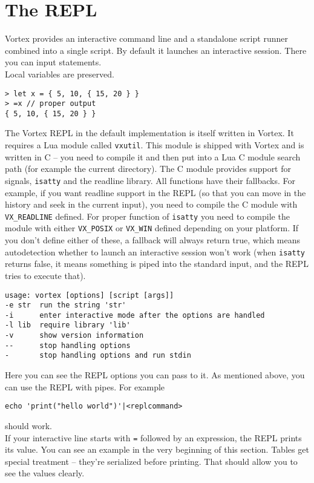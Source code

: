 \documentclass{article}
\begin{document}
\section{The REPL}
Vortex provides an interactive command line and a standalone script runner
combined into a single script. By default it launches an interactive session.
There you can input statements.\\
Local variables are preserved.
\begin{lstlisting}[language=vortex,numbers=none]
> let x = { 5, 10, { 15, 20 } }
> =x // proper output
{ 5, 10, { 15, 20 } }
\end{lstlisting}
The Vortex REPL in the default implementation is itself written in Vortex.
It requires a Lua module called \verb|vxutil|. This module is shipped with
Vortex and is written in C -- you need to compile it and then put into a
Lua C module search path (for example the current directory). The C module
provides support for signals, \verb|isatty| and the readline library. All
functions have their fallbacks. For example, if you want readline support in
the REPL (so that you can move in the history and seek in the current input),
you need to compile the C module with \verb|VX_READLINE| defined. For proper
function of \verb|isatty| you need to compile the module with either
\verb|VX_POSIX| or \verb|VX_WIN| defined depending on your platform. If you
don't define either of these, a fallback will always return true, which
means autodetection whether to launch an interactive session won't work
(when \verb|isatty| returns false, it means something is piped into the
standard input, and the REPL tries to execute that).
\begin{lstlisting}[language=text]
usage: vortex [options] [script [args]]
-e str  run the string 'str'
-i      enter interactive mode after the options are handled
-l lib  require library 'lib'
-v      show version information
--      stop handling options
-       stop handling options and run stdin
\end{lstlisting}
Here you can see the REPL options you can pass to it. As mentioned above,
you can use the REPL with pipes. For example
\begin{lstlisting}[language=text]
echo 'print("hello world")'|<replcommand>
\end{lstlisting}
should work.\\
If your interactive line starts with \verb|=| followed by an expression,
the REPL prints its value. You can see an example in the very beginning
of this section. Tables get special treatment -- they're serialized before
printing. That should allow you to see the values clearly.
\end{document}
